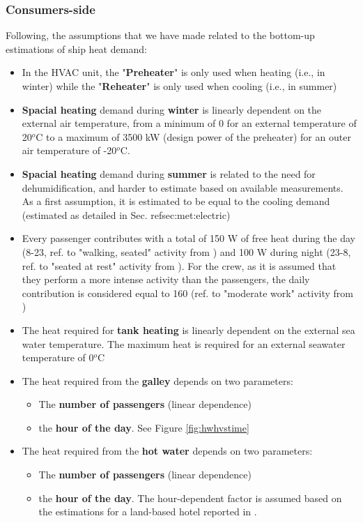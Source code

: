 \documentclass[preprint,12pt]{elsarticle}
\begin{document}
\subsubsection*{Consumers-side}
Following, the assumptions that we have made related to the bottom-up estimations of ship heat demand:
\begin{itemize}
	\item In the HVAC unit, the "\textbf{Preheater}" is only used when heating (i.e., in winter) while the "\textbf{Reheater}" is only used when cooling (i.e., in summer)
	\item \textbf{Spacial heating} demand during \textbf{winter} is linearly dependent on the external air temperature, from a minimum of 0 for an external temperature of 20$^o$C to a maximum of 3500 kW (design power of the preheater)  for an outer air temperature of -20$^o$C.
	\item \textbf{Spacial heating} demand during \textbf{summer} is related to the need for dehumidification, and harder to estimate based on available measurements. As a first assumption, it is estimated to be equal to the cooling demand (estimated as detailed in Sec. ref{sec:met:electric})
	\item Every passenger contributes with a total of 150 W of free heat during the day (8-23, ref. to "walking, seated" activity from \cite{Wang2000}) and 100 W during night (23-8, ref. to "seated at rest" activity from \cite{Wang2000}). For the crew, as it is assumed that they perform a more intense activity than the passengers, the daily contribution is considered equal to 160 (ref. to "moderate work" activity from \cite{Wang2000}) 
	\item The heat required for \textbf{tank heating} is linearly dependent on the external sea water temperature. The maximum heat is required for an external seawater temperature of 0$^o$C
	\item The heat required from the \textbf{galley} depends on two parameters:
	\begin{itemize}
		\item The \textbf{number of passengers} (linear dependence)
		\item the \textbf{hour of the day}. See Figure \ref{fig:hwhvstime}
	\end{itemize}
	\item The heat required from the \textbf{hot water} depends on two parameters:
	\begin{itemize}
		\item The \textbf{number of passengers} (linear dependence)
		\item the \textbf{hour of the day}. The hour-dependent factor is assumed based on the estimations for a land-based hotel reported in \cite{Chung2015}.
	\end{itemize}   
\end{itemize}
\end{document}
